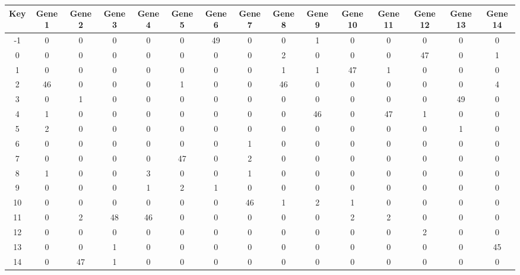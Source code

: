 \begin{tabular}{|c|c|c|c|c|c|c|c|c|c|c|c|c|c|c|}
\hline
Key & Gene 1 & Gene 2 & Gene 3 & Gene 4 & Gene 5 & Gene 6 & Gene 7 & Gene 8 & Gene 9 & Gene 10 & Gene 11 & Gene 12 & Gene 13 & Gene 14 \\
\hline
-1 & 0 & 0 & 0 & 0 & 0 & 49 & 0 & 0 & 1 & 0 & 0 & 0 & 0 & 0 \\
0 & 0 & 0 & 0 & 0 & 0 & 0 & 0 & 2 & 0 & 0 & 0 & 47 & 0 & 1 \\
1 & 0 & 0 & 0 & 0 & 0 & 0 & 0 & 1 & 1 & 47 & 1 & 0 & 0 & 0 \\
2 & 46 & 0 & 0 & 0 & 1 & 0 & 0 & 46 & 0 & 0 & 0 & 0 & 0 & 4 \\
3 & 0 & 1 & 0 & 0 & 0 & 0 & 0 & 0 & 0 & 0 & 0 & 0 & 49 & 0 \\
4 & 1 & 0 & 0 & 0 & 0 & 0 & 0 & 0 & 46 & 0 & 47 & 1 & 0 & 0 \\
5 & 2 & 0 & 0 & 0 & 0 & 0 & 0 & 0 & 0 & 0 & 0 & 0 & 1 & 0 \\
6 & 0 & 0 & 0 & 0 & 0 & 0 & 1 & 0 & 0 & 0 & 0 & 0 & 0 & 0 \\
7 & 0 & 0 & 0 & 0 & 47 & 0 & 2 & 0 & 0 & 0 & 0 & 0 & 0 & 0 \\
8 & 1 & 0 & 0 & 3 & 0 & 0 & 1 & 0 & 0 & 0 & 0 & 0 & 0 & 0 \\
9 & 0 & 0 & 0 & 1 & 2 & 1 & 0 & 0 & 0 & 0 & 0 & 0 & 0 & 0 \\
10 & 0 & 0 & 0 & 0 & 0 & 0 & 46 & 1 & 2 & 1 & 0 & 0 & 0 & 0 \\
11 & 0 & 2 & 48 & 46 & 0 & 0 & 0 & 0 & 0 & 2 & 2 & 0 & 0 & 0 \\
12 & 0 & 0 & 0 & 0 & 0 & 0 & 0 & 0 & 0 & 0 & 0 & 2 & 0 & 0 \\
13 & 0 & 0 & 1 & 0 & 0 & 0 & 0 & 0 & 0 & 0 & 0 & 0 & 0 & 45 \\
14 & 0 & 47 & 1 & 0 & 0 & 0 & 0 & 0 & 0 & 0 & 0 & 0 & 0 & 0 \\
\hline
\end{tabular}